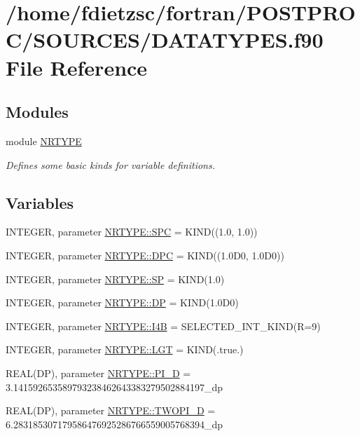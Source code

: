 \hypertarget{DATATYPES_8f90}{
\section{/home/fdietzsc/fortran/POSTPROC/SOURCES/DATATYPES.f90 File Reference}
\label{DATATYPES_8f90}
}
\subsection*{Modules}
\begin{DoxyCompactItemize}
\item 
module \hyperlink{namespaceNRTYPE}{NRTYPE}


\begin{DoxyCompactList}\small\item\em Defines some basic kinds for variable definitions. \end{DoxyCompactList}

\end{DoxyCompactItemize}
\subsection*{Variables}
\begin{DoxyCompactItemize}
\item 
INTEGER, parameter \hyperlink{namespaceNRTYPE_a203d15b0d754eb809bb2d9689c0f4a20}{NRTYPE::SPC} = KIND((1.0, 1.0))
\item 
INTEGER, parameter \hyperlink{namespaceNRTYPE_aef0a8a355687c7f4bb0cfc4da1fa7dc1}{NRTYPE::DPC} = KIND((1.0D0, 1.0D0))
\item 
INTEGER, parameter \hyperlink{namespaceNRTYPE_a0e27dcc6c8b8c3b676b0ebdeda77f849}{NRTYPE::SP} = KIND(1.0)
\item 
INTEGER, parameter \hyperlink{namespaceNRTYPE_ac04234d0d9fbb992bc90e09d33317d5a}{NRTYPE::DP} = KIND(1.0D0)
\item 
INTEGER, parameter \hyperlink{namespaceNRTYPE_a58a56fb59c61ae4e8af28eabfe3d3b59}{NRTYPE::I4B} = SELECTED\_\-INT\_\-KIND(R=9)
\item 
INTEGER, parameter \hyperlink{namespaceNRTYPE_ac467681e919a8be9d83a8bf1808d497c}{NRTYPE::LGT} = KIND(.true.)
\item 
REAL(DP), parameter \hyperlink{namespaceNRTYPE_a651a3a781cff22a0a0886657381949db}{NRTYPE::PI\_\-D} = 3.141592653589793238462643383279502884197\_\-dp
\item 
REAL(DP), parameter \hyperlink{namespaceNRTYPE_a39b7abf71e8b2487187ea1b1f3a2dedf}{NRTYPE::TWOPI\_\-D} = 6.283185307179586476925286766559005768394\_\-dp
\end{DoxyCompactItemize}
